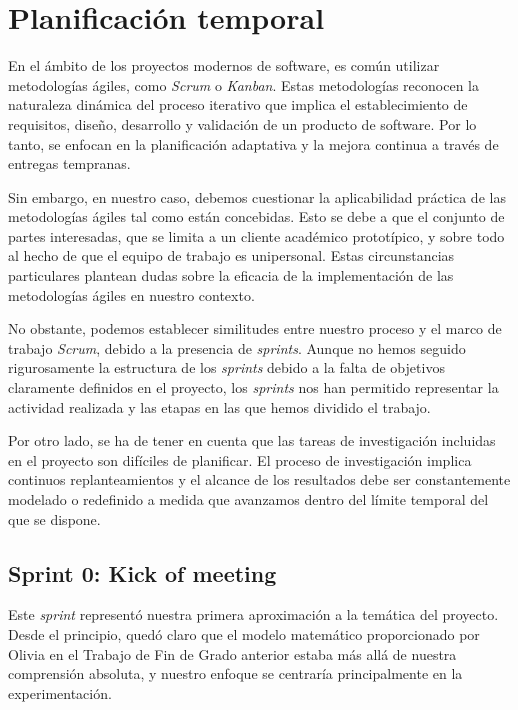 \section{Planificación temporal}

En el ámbito de los proyectos modernos de software, es común utilizar metodologías ágiles, como \textit{Scrum} 
o \textit{Kanban}. Estas metodologías reconocen la naturaleza dinámica del proceso iterativo que implica el 
establecimiento de requisitos, diseño, desarrollo y validación de un producto de software. Por lo tanto, 
se enfocan en la planificación adaptativa y la mejora continua a través de entregas tempranas.

Sin embargo, en nuestro caso, debemos cuestionar la aplicabilidad práctica de las metodologías ágiles 
tal como están concebidas. Esto se debe a que el conjunto de partes interesadas, que se limita a un 
cliente académico prototípico, y sobre todo al hecho de que el equipo de trabajo es unipersonal. Estas 
circunstancias particulares plantean dudas sobre la eficacia de la implementación de las metodologías 
ágiles en nuestro contexto.

No obstante, podemos establecer similitudes entre nuestro proceso y el marco de trabajo \textit{Scrum}, 
debido a la presencia de \textit{sprints}. Aunque no hemos seguido rigurosamente la estructura de los \textit{sprints} 
debido a la falta de objetivos claramente definidos en el proyecto, los \textit{sprints} nos han permitido 
representar la actividad realizada y las etapas en las que hemos dividido el trabajo.

Por otro lado, se ha de tener en cuenta que las tareas de investigación incluidas en el proyecto son 
difíciles de planificar. El proceso de investigación implica continuos replanteamientos y el alcance de 
los resultados debe ser constantemente modelado o redefinido a medida que avanzamos dentro del límite 
temporal del que se dispone.

\subsection{Sprint 0: Kick of meeting}

Este \textit{sprint} representó nuestra primera aproximación a la temática del proyecto. Desde el principio, quedó 
claro que el modelo matemático proporcionado por Olivia en el Trabajo de Fin de Grado anterior estaba más allá de 
nuestra comprensión absoluta, y nuestro enfoque se centraría principalmente en la experimentación.


